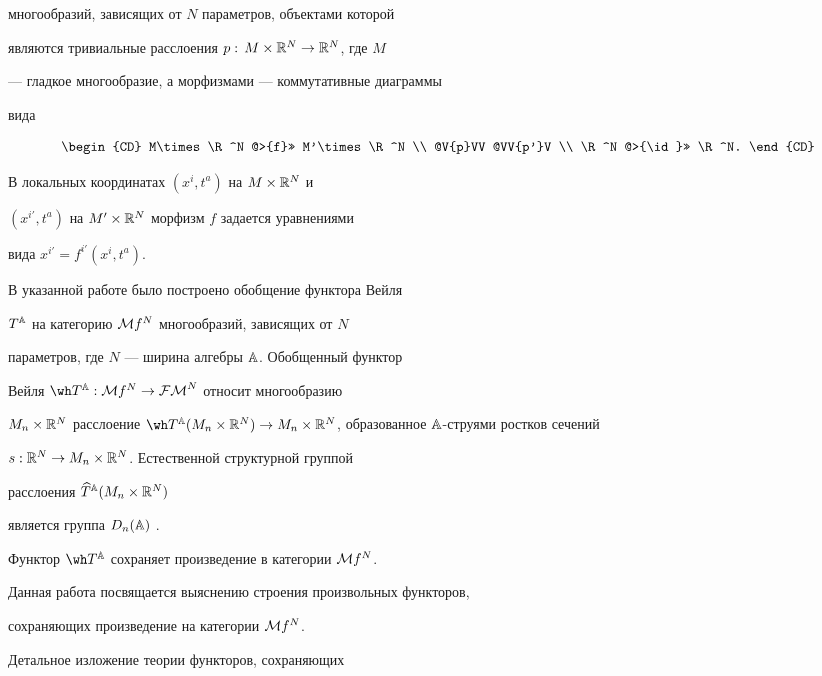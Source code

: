многообразий, зависящих от $N$ параметров, объектами которой


являются тривиальные расслоения $p:\, M\times{\Bbb R}^N\rightarrow{\Bbb R}^N$, где $M$


--- гладкое многообразие, а морфизмами --- коммутативные диаграммы


вида


$$


\begin{CD}


M\times\R^N @>{f}>> M'\times\R^N \\


@V{p}VV @VV{p'}V \\


\R^N @>{\id}>> \R^N.


\end{CD}


$$





В локальных координатах $(x^i,t^a)$ на $M\times{\Bbb R}^N$ и


$(x^{i'},t^a)$ на $M'\times{\Bbb R}^N$ морфизм $f$ задается уравнениями


вида ${x^{i'}=f^{i'}(x^i,t^a)}$.


В указанной  работе было построено обобщение функтора Вейля


$T^{\Bbb A}$ на категорию ${\cal M} f^N$ многообразий, зависящих от $N$


параметров, где $N$ --- ширина алгебры ${\Bbb A}$. Обобщенный функтор


Вейля $\wh T{}^\A:\M f^N\to\FM^N$ относит  многообразию


$M_n\times\R^N$ расслоение $\wh T{}^\A (M_n\times\R^N)\to


M_n\times\R^N$, образованное $\A$-струями ростков сечений


$s:{\Bbb R}^N\rightarrow M_n\times{\Bbb R}^N$. Естественной структурной группой


расслоения $\widehat T{}^{\Bbb A}(M_n\times {\Bbb R}^N)$


является группа $D_n({\Bbb A})$ \cite{VSh1}.





Функтор $\wh T{}^\A$ сохраняет произведение в категории ${\cal M} f^N$.


Данная работа посвящается выяснению строения произвольных функторов,


сохраняющих произведение на категории ${\cal M} f^N$.


Детальное изложение теории функторов, сохраняющих


